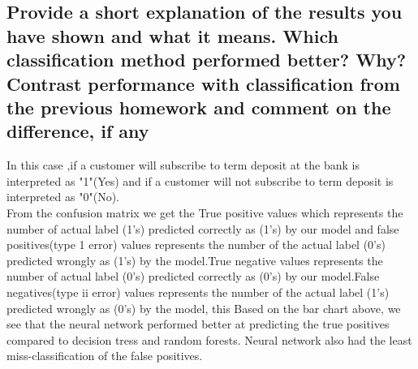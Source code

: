 \subsection{Provide a short explanation of the results you have shown and what it means. Which classification method performed better? Why? Contrast performance with classification from the previous homework and comment on the difference, if any}
In this case ,if a customer will subscribe to term deposit at the bank is interpreted as "1"(Yes) and if a customer will not subscribe to term deposit is interpreted as "0"(No).\\
From the confusion matrix we get the True positive values  which represents the number of actual label (1's) predicted correctly as (1's) by our model and false positives(type 1 error) values represents the number of the  actual label (0's) predicted wrongly as (1's) by the model.True negative values represents the number of actual label (0's) predicted correctly as (0's) by our model.False negatives(type ii error) values represents the number of the  actual label (1's) predicted wrongly as (0's) by the model, this  Based on the bar chart above, we see that the neural network performed better at predicting the true positives compared to decision tress and random forests. Neural network also had the least miss-classification of the false positives. 



